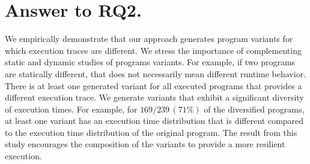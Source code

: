 \section{Answer to RQ2.}
We empirically demonstrate that our approach generates program variants for which execution traces are different. We stress the importance of complementing static and dynamic studies of programs variants. For example, if two programs are statically different, that does not necessarily mean different runtime behavior. There is at least one generated variant for all executed programs that provides a different execution trace. 
We generate variants that exhibit a significant diversity of execution times. For example, for $169/239\,(71\%)$ of the diversified programs, at least one variant has an execution time distribution that is different compared to the execution time distribution of the original program. 
The result from this study encourages the composition of the variants to provide a more resilient execution.